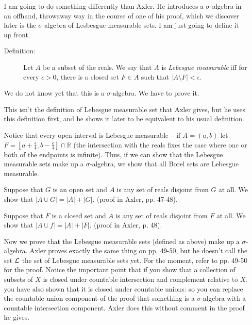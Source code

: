 \documentclass[12pt]{article}
\begin{document}
I am going to do something differently than Axler.  He introduces a $\sigma$-algebra in an offhand, throwaway way in the course of one of his proof, which we discover later is the $\sigma$-algebra of Lesbesgue measurable sets.  I am just going to define it up front.

\begin{description}

\item[Definition:]  Let $A$ be a subset of the reals.  We say that $A$ is {\em Lebesgue measurable\/} iff for every $\epsilon>0$, there is a closed set $F \in A$ such that $|A \setminus F|<\epsilon$.

\end{description}

We do not know yet that this is a $\sigma$-algebra.  We have to prove it.

This isn't the definition of Lebesgue measurable set that Axler gives, but he uses this definition first, and he shows it later to be equivalent to his usual definition.

Notice that every open interval is Lebesgue measurable -- if $A = (a,b)$ let $F = [a+\frac{\epsilon}4,b-\frac{\epsilon}4]\cap \mathbb R$ (the intersection with the reals fixes the case where one or both of the endpoints is infinite).  Thus, if we can show that the Lebesgue measurable sets make up a $\sigma$-algebra, we show that all Borel sets are Lebesgue measurable.

Suppose that $G$ is an open set and $A$ is any set of reals disjoint from $G$ at all.  We show that $|A \cup G| = |A|+|G|$.  (proof in Axler, pp. 47-48).

Suppose that $F$ is a closed set and $A$ is any set of reals disjoint from $F$ at all.  We show that $|A \cup f| = |A|+|F|$.  (proof in Axler, p. 48).

Now we prove that the Lebesgue measurable sets (defined as above) make up a $\sigma$-algebra.  Axler proves exactly the same thing on pp. 49-50, but he doesn't call the set $\cal L$ the set of Lebesgue measurable sets yet.  For the moment, refer to pp. 49-50 for the proof.  Notice the important point that if you show that a collection of subsets of $X$ is closed under countable intersection and complement relative to $X$, you have also shown that it is closed under countable unions:  so you can replace the countable union component of the proof that something is a $\sigma$-algebra with a countable intersection component.  Axler does this without comment in the proof he gives.
\end{document}
